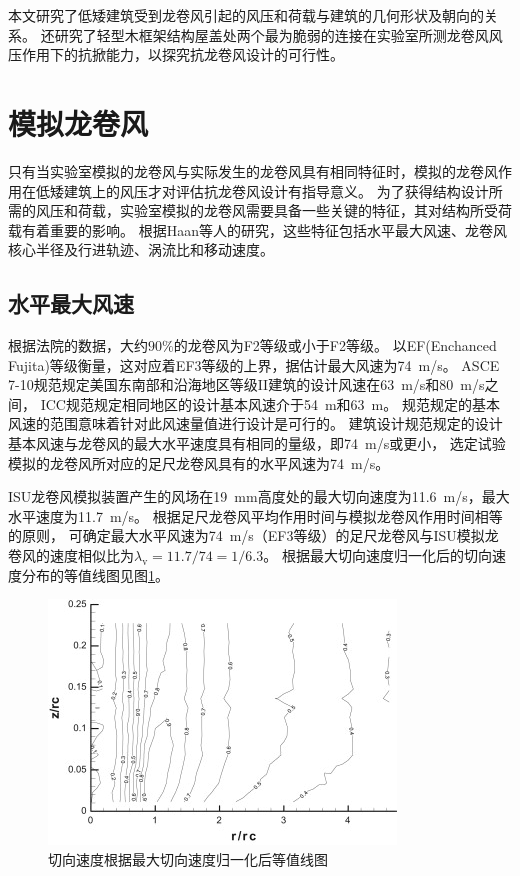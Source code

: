 \documentclass{ctexart}
\begin{document}
本文研究了低矮建筑受到龙卷风引起的风压和荷载与建筑的几何形状及朝向的关系。
还研究了轻型木框架结构屋盖处两个最为脆弱的连接在实验室所测龙卷风风压作用下的抗掀能力，以探究抗龙卷风设计的可行性。

\section{模拟龙卷风}
只有当实验室模拟的龙卷风与实际发生的龙卷风具有相同特征时，模拟的龙卷风作用在低矮建筑上的风压才对评估抗龙卷风设计有指导意义。
为了获得结构设计所需的风压和荷载，实验室模拟的龙卷风需要具备一些关键的特征，其对结构所受荷载有着重要的影响。
根据Haan等人\cite{haan2009tornado}的研究，这些特征包括水平最大风速、龙卷风核心半径及行进轨迹、涡流比和移动速度。

\subsection{水平最大风速}
根据法院的数据，大约$90 \%$的龙卷风为F2等级或小于F2等级\cite{bluestein1993review}。
以EF(Enchanced Fujita)\cite{marshall2004enhanced}等级衡量，这对应着EF3等级的上界，据估计最大风速为\SI{74}{m/s}。
ASCE 7-10规范\cite{american1994minimum}规定美国东南部和沿海地区等级II建筑的设计风速在\SI{63}{m/s}和\SI{80}{m/s}之间，
ICC规范\cite{ibc2012international}规定相同地区的设计基本风速介于\SI{54}{m}和\SI{63}{m}。
规范规定的基本风速的范围意味着针对此风速量值进行设计是可行的。
建筑设计规范规定的设计基本风速与龙卷风的最大水平速度具有相同的量级，即\SI{74}{m/s}或更小，
选定试验模拟的龙卷风所对应的足尺龙卷风具有的水平风速为\SI{74}{m/s}。

ISU龙卷风模拟装置产生的风场在\SI{19}{mm}高度处的最大切向速度为\SI{11.6}{m/s}，最大水平速度为\SI{11.7}{m/s}。
根据足尺龙卷风平均作用时间与模拟龙卷风作用时间相等的原则，
可确定最大水平风速为\SI{74}{m/s}（EF3等级）的足尺龙卷风与ISU模拟龙卷风的速度相似比为$\lambda_{\mathrm{v}}=11.7/74=1/6.3$。
根据最大切向速度归一化后的切向速度分布的等值线图见图\ref{fig:Vt-contour}。 

\begin{figure}
\centering
\includegraphics{./fig/1.jpg}
\caption{切向速度根据最大切向速度归一化后等值线图}
\label{fig:Vt-contour}
\end{figure}
\end{document}
